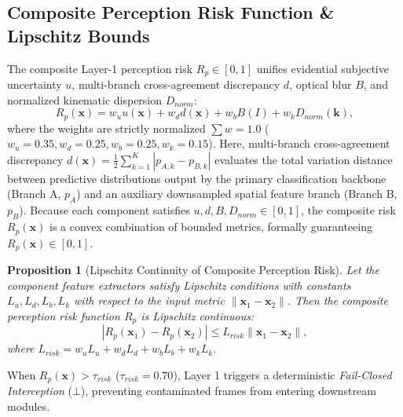 \documentclass[conference]{IEEEtran}
\newtheorem{proposition}{Proposition}
\begin{document}
\subsection{Composite Perception Risk Function \& Lipschitz Bounds}
The composite Layer-1 perception risk $R_p \in [0, 1]$ unifies evidential subjective uncertainty $u$, multi-branch cross-agreement discrepancy $d$, optical blur $B$, and normalized kinematic dispersion $D_{norm}$:
\begin{equation}
R_p(\mathbf{x}) = w_u u(\mathbf{x}) + w_d d(\mathbf{x}) + w_b B(I) + w_k D_{norm}(\mathbf{k}),
\end{equation}
where the weights are strictly normalized $\sum w = 1.0$ ($w_u=0.35, w_d=0.25, w_b=0.25, w_k=0.15$). Here, multi-branch cross-agreement discrepancy $d(\mathbf{x}) = \frac{1}{2}\sum_{k=1}^K |p_{A,k} - p_{B,k}|$ evaluates the total variation distance between predictive distributions output by the primary classification backbone (Branch A, $p_A$) and an auxiliary downsampled spatial feature branch (Branch B, $p_B$). Because each component satisfies $u, d, B, D_{norm} \in [0, 1]$, the composite risk $R_p(\mathbf{x})$ is a convex combination of bounded metrics, formally guaranteeing $R_p(\mathbf{x}) \in [0, 1]$.

\begin{proposition}[Lipschitz Continuity of Composite Perception Risk]
Let the component feature extractors satisfy Lipschitz conditions with constants $L_u, L_d, L_b, L_k$ with respect to the input metric $\|\mathbf{x}_1 - \mathbf{x}_2\|$. Then the composite perception risk function $R_p$ is Lipschitz continuous:
\begin{equation}
|R_p(\mathbf{x}_1) - R_p(\mathbf{x}_2)| \le L_{risk} \|\mathbf{x}_1 - \mathbf{x}_2\|,
\end{equation}
where $L_{risk} = w_u L_u + w_d L_d + w_b L_b + w_k L_k$.
\end{proposition}

When $R_p(\mathbf{x}) > \tau_{risk}$ ($\tau_{risk}=0.70$), Layer 1 triggers a deterministic \textit{Fail-Closed Interception} ($\bot$), preventing contaminated frames from entering downstream modules.
\end{document}
